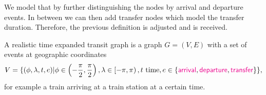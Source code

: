 	We model that by further distinguishing the nodes by arrival and departure events. In between we can then add transfer
	nodes which model the transfer duration. Therefore, the previous definition is adjusted and  is received.
	\begin{mydef}\label{realisticTransitGraph}
		A \textnormal{realistic time expanded transit graph} is a graph $G = (V, E)$ with a set of events at geographic coordinates
		\begin{align*}
			V = \{(\phi, \lambda, t, e) | \phi \in \left(-\frac{\pi}{2}, \frac{\pi}{2}\right), \lambda \in \left[-\pi, \pi\right),
			t \text{ time}, e \in \{\textcolor{magenta}{\textsf{arrival}}, \textcolor{magenta}{\textsf{departure}}, \textcolor{magenta}{\textsf{transfer}}\}\},
		\end{align*}
		for example a train arriving at a train station at a certain time.
		

\end{mydef}
